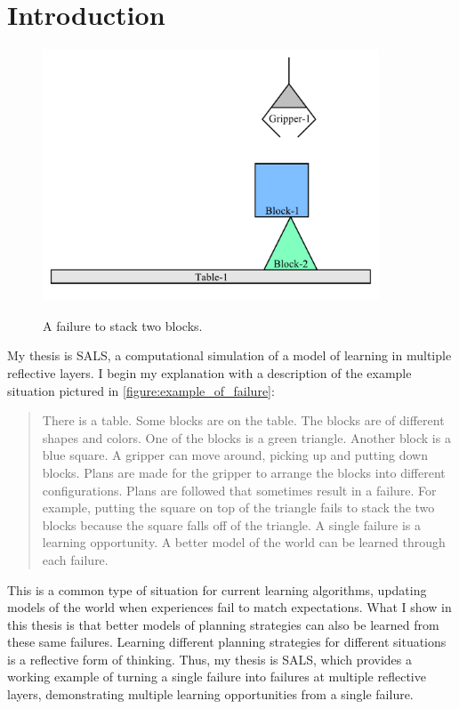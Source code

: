\chapter{Introduction}
\label{chapter:introduction}

\begin{figure}[bth]
\includegraphics[width=10cm]{gfx/blocks_world_example_failure} \\ \medskip
\caption{A failure to stack two blocks.}
\label{figure:example_of_failure}
\end{figure}

My thesis is SALS, a computational simulation of a model of learning
in multiple reflective layers.  I begin my explanation with a
description of the example situation pictured in
\autoref{figure:example_of_failure}:
\begin{quote}
There is a table.  Some blocks are on the table.  The blocks are of
different shapes and colors.  One of the blocks is a green triangle.
Another block is a blue square.  A gripper can move around, picking up
and putting down blocks.  Plans are made for the gripper to arrange
the blocks into different configurations.  Plans are followed that
sometimes result in a failure.  For example, putting the square on top
of the triangle fails to stack the two blocks because the square falls
off of the triangle.  A single failure is a learning opportunity.  A
better model of the world can be learned through each failure.
\end{quote}
This is a common type of situation for current learning algorithms,
updating models of the world when experiences fail to match
expectations.  What I show in this thesis is that better models of
planning strategies can also be learned from these same failures.
Learning different planning strategies for different situations is a
reflective form of thinking.  Thus, my thesis is SALS, which provides
a working example of turning a single failure into failures at
multiple reflective layers, demonstrating multiple learning
opportunities from a single failure.

